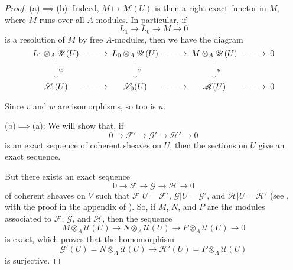 \documentclass[british]{article}
\begin{document}
\begin{proof}
(a)\(\implies\)(b): Indeed, \(M\mapsto{\mathscr{M}}(U)\) is then a
right-exact functor in \(M\), where \(M\) runs over all \(A\)-modules.
In particular, if \[
  L_1 \to L_0 \to M \to 0
\] is a resolution of \(M\) by free \(A\)-modules, then we have the
diagram \[
  \begin{CD}
    L_1\otimes_A{\mathscr{U}}(U) @>>> L_0\otimes_A{\mathscr{U}}(U) @>>> M\otimes_A{\mathscr{U}}(U) @>>> 0
  \\@VV{w}V @VV{v}V @VV{u}V @.
  \\{\mathscr{L}}_1(U) @>>> {\mathscr{L}}_0(U) @>>> {\mathscr{M}}(U) @>>> 0
  \end{CD}
\]

Since \(v\) and \(w\) are isomorphisms, so too is \(u\).

\bigskip

(b)\(\implies\)(a): We will show that, if \[
  0 \to {\mathscr{F}}' \to{\mathscr{G}}' \to {\mathscr{H}}' \to 0
\] is an exact sequence of coherent sheaves on \(U\), then the sections
on \(U\) give an exact sequence.

But there exists an exact sequence \[
  0 \to {\mathscr{F}} \to {\mathscr{G}} \to {\mathscr{H}} \to 0
\] of coherent sheaves on \(V\) such that
\({\mathscr{F}}|U={\mathscr{F}}'\), \({\mathscr{G}}|U={\mathscr{G}}'\),
and \({\mathscr{H}}|U={\mathscr{H}}'\) (see \autocite{1}, with the proof
in the appendix of \autocite{2}). So, if \(M\), \(N\), and \(P\) are the
modules associated to \({\mathscr{F}}\), \({\mathscr{G}}\), and
\({\mathscr{H}}\), then the sequence \[
  M\otimes_A{\mathscr{U}}(U) \to N\otimes_A{\mathscr{U}}(U) \to P\otimes_A{\mathscr{U}}(U) \to 0
\] is exact, which proves that the homomorphism \[
  {\mathscr{G}}'(U) = N\otimes_A{\mathscr{U}}(U) \to {\mathscr{H}}'(U) = P\otimes_A{\mathscr{U}}(U)
\] is surjective.
\end{proof}


\nocite{*}
\printbibliography[heading=bibintoc,title=Bibliography]
\end{document}
